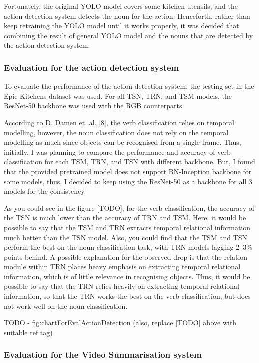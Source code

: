 \documentclass{article}
\begin{document}
Fortunately, the original YOLO model covers some kitchen utensils, and the action detection system detects the noun for the action. Henceforth, rather than keep retraining the YOLO model until it works properly, it was decided that combining the result of general YOLO model and the nouns that are detected by the action detection system.

\subsubsection{Evaluation for the action detection system}

To evaluate the performance of the action detection system, the testing set in the Epic-Kitchens dataset was used. For all TSN, TRN, and TSM models, the ResNet-50 backbone was used with the RGB counterparts.

According to \hyperlink{ref8}{D. Damen et. al. [8]}, the verb classification relies on temporal modelling, however, the noun classification does not rely on the temporal modelling as much since objects can be recognised from a single frame. Thus, initially, I was planning to compare the performance and accuracy of verb classification for each TSM, TRN, and TSN with different backbone. But, I found that the provided pretrained model does not support BN-Inception backbone for some models, thus, I decided to keep using the ResNet-50 as a backbone for all 3 models for the consistency.

As you could see in the figure [TODO], for the verb classification, the accuracy of the TSN is much lower than the accuracy of TRN and TSM. Here, it would be possible to say that the TSM and TRN extracts temporal relational information much better than the TSN model. Also, you could find that the TSM and TSN perform the best on the noun classification task, with TRN models lagging 2–3\% points behind. A possible explanation for the observed drop is that the relation module within TRN places heavy emphasis on extracting temporal relational information, which is of little relevance in recognising objects. Thus, it would be possible to say that the TRN relies heavily on extracting temporal relational information, so that the TRN works the best on the verb classification, but does not work well on the noun classification.

TODO - fig:chartForEvalActionDetection (also, replace [TODO] above with suitable ref tag)

\subsubsection{Evaluation for the Video Summarisation system}
\end{document}
